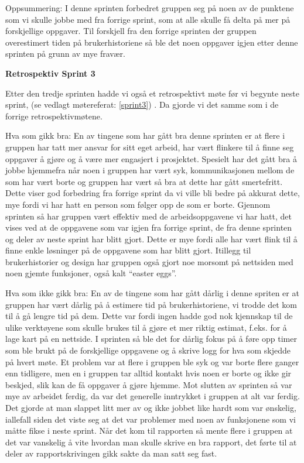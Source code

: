 \documentclass[12pt,a4paper,norsk]{article}
\begin{document}
Oppsummering:
I denne sprinten forbedret gruppen seg på noen av de punktene som vi skulle jobbe med fra forrige sprint, som at alle skulle få delta på mer på forskjellige oppgaver. Til forskjell fra den forrige sprinten der gruppen overestimert tiden på brukerhistoriene så ble det noen oppgaver igjen etter denne sprinten på grunn av mye fravær. 

\bigskip \noindent \textbf{Retrospektiv Sprint 3}
\par Etter den tredje sprinten hadde vi også et retrospektivt møte før vi begynte neste sprint, (se vedlagt møtereferat: \ref{sprint3}) . Da gjorde vi det samme som i de forrige retrospektivmøtene. 

Hva som gikk bra:
En av tingene som har gått bra denne sprinten er at flere i gruppen har tatt mer ansvar for sitt eget arbeid, har vært flinkere til å finne seg oppgaver å gjøre og å være mer engasjert i prosjektet. Spesielt har det gått bra å jobbe hjemmefra når noen i gruppen har vært syk, kommunikasjonen mellom de som har vært borte og gruppen har vært så bra at dette har gått smertefritt. Dette viser god forbedring fra forrige sprint da vi ville bli bedre på akkurat dette, mye fordi vi har hatt en person som følger opp de som er borte. 
Gjennom sprinten så har gruppen vært effektiv med de arbeidsoppgavene vi har hatt, det vises ved at de oppgavene som var igjen fra forrige sprint, de fra denne sprinten og deler av neste sprint har blitt gjort. Dette er mye fordi alle har vært flink til å finne enkle løsninger på de oppgavene som har blitt gjort. 
Itillegg til brukerhistorier og design har gruppen også gjort noe morsomt på nettsiden med noen gjemte funksjoner, også kalt “easter eggs”.  

Hva som ikke gikk bra:
En av de tingene som har gått dårlig i denne spriten er at gruppen har vært dårlig på å estimere tid på brukerhistoriene, vi trodde det kom til å gå lengre tid på dem. Dette var fordi ingen hadde god nok kjennskap til de ulike verktøyene som skulle brukes til å gjøre et mer riktig estimat, f.eks. for å lage kart på en nettside.
I sprinten så ble det for dårlig fokus på å føre opp timer som ble brukt på de forskjellige oppgavene og å skrive logg for hva som skjedde på hvert møte. 
Et problem var at flere i gruppen ble syk og var borte flere ganger enn tidligere, men en i gruppen tar alltid kontakt hvis noen er borte og ikke gir beskjed, slik kan de få oppgaver å gjøre hjemme. 
Mot slutten av sprinten så var mye av arbeidet ferdig, da var det generelle inntrykket i gruppen at alt var ferdig. Det gjorde at man slappet litt mer av og ikke jobbet like hardt som var ønskelig, iallefall siden det viste seg at det var problemer med noen av funksjonene som vi måtte fikse i neste sprint. 
Når det kom til rapporten så mente flere i gruppen at det var vanskelig å vite hvordan man skulle skrive en bra rapport, det førte til at deler av rapportskrivingen gikk sakte da man satt seg fast.
\end{document}
